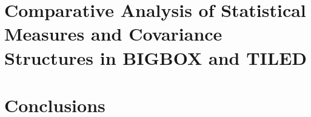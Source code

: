 \documentclass[11pt,a4paper]{ipmu}
\begin{document}
\chapter{Comparative Analysis of Statistical Measures and Covariance Structures in BIGBOX and TILED}
\label{chap:results}
\minitoc 


\chapter{Conclusions}
\label{chap:conclusions}




\backmatter


\end{document}
